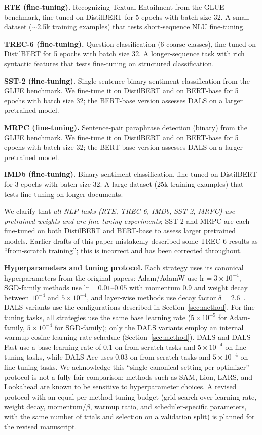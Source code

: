 \documentclass[a4paper,fleqn]{cas-dc}
\begin{document}
\textbf{RTE (fine-tuning).} Recognizing Textual Entailment from the GLUE benchmark, fine-tuned on DistilBERT for 5 epochs with batch size 32. A small dataset ($\sim$2.5k training examples) that tests short-sequence NLU fine-tuning.

\textbf{TREC-6 (fine-tuning).} Question classification (6 coarse classes), fine-tuned on DistilBERT for 5 epochs with batch size 32. A longer-sequence task with rich syntactic features that tests fine-tuning on structured classification.

\textbf{SST-2 (fine-tuning).} Single-sentence binary sentiment classification from the GLUE benchmark. We fine-tune it on DistilBERT and on BERT-base for 5 epochs with batch size 32; the BERT-base version assesses DALS on a larger pretrained model.

\textbf{MRPC (fine-tuning).} Sentence-pair paraphrase detection (binary) from the GLUE benchmark. We fine-tune it on DistilBERT and on BERT-base for 5 epochs with batch size 32; the BERT-base version assesses DALS on a larger pretrained model.

\textbf{IMDb (fine-tuning).} Binary sentiment classification, fine-tuned on DistilBERT for 3 epochs with batch size 32. A large dataset (25k training examples) that tests fine-tuning on longer documents.

We clarify that \emph{all NLP tasks (RTE, TREC-6, IMDb, SST-2, MRPC) use pretrained weights and are fine-tuning experiments}; SST-2 and MRPC are each fine-tuned on both DistilBERT and BERT-base to assess larger pretrained models. Earlier drafts of this paper mistakenly described some TREC-6 results as ``from-scratch training''; this is incorrect and has been corrected throughout.

\textbf{Hyperparameters and tuning protocol.}\label{sec:hp_protocol} Each strategy uses its canonical hyperparameters from the original papers: Adam/AdamW use $\text{lr}=3\times10^{-4}$, SGD-family methods use $\text{lr}=0.01$--$0.05$ with momentum 0.9 and weight decay between $10^{-4}$ and $5\times10^{-4}$, and layer-wise methods use decay factor $\delta=2.6$~\citet{howard2018ulmfit}. DALS variants use the configurations described in Section~\ref{sec:method}. For fine-tuning tasks, all strategies use the same base learning rate ($5\times10^{-5}$ for Adam-family, $5\times10^{-4}$ for SGD-family); only the DALS variants employ an internal warmup-cosine learning-rate schedule (Section~\ref{sec:method}). DALS and DALS-Fast use a base learning rate of 0.1 on from-scratch tasks and $5\times10^{-4}$ on fine-tuning tasks, while DALS-Acc uses 0.03 on from-scratch tasks and $5\times10^{-4}$ on fine-tuning tasks. We acknowledge this ``single canonical setting per optimizer'' protocol is not a fully fair comparison: methods such as SAM, Lion, LARS, and Lookahead are known to be sensitive to hyperparameter choices. A revised protocol with an equal per-method tuning budget (grid search over learning rate, weight decay, momentum/$\beta$, warmup ratio, and scheduler-specific parameters, with the same number of trials and selection on a validation split) is planned for the revised manuscript.
\end{document}
